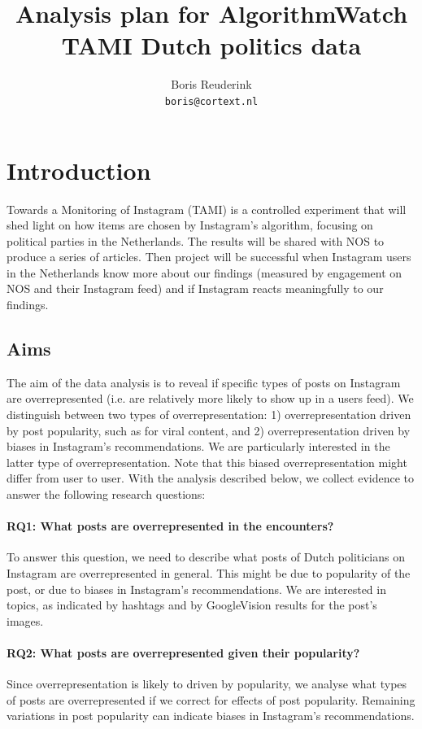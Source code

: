 \documentclass[a4paper]{article}
\author{Boris Reuderink\\\texttt{boris@cortext.nl}}
\title{Analysis plan for AlgorithmWatch TAMI Dutch politics data}
\begin{document}
\maketitle
\tableofcontents
\section{Introduction}
Towards a Monitoring of Instagram (TAMI) is a controlled experiment that will
shed light on how items are chosen by Instagram's algorithm, focusing on
political parties in the Netherlands. The results will be shared with NOS to
produce a series of articles. Then project will be successful when Instagram
users in the Netherlands know more about our findings (measured by engagement
on NOS and their Instagram feed) and if Instagram reacts meaningfully to our
findings.

\subsection{Aims}
The aim of the data analysis is to reveal if specific types of posts on
Instagram are overrepresented (i.e. are relatively more likely to show up in
a users feed). We distinguish between two types of overrepresentation: 1)
overrepresentation driven by post popularity, such as for viral content, and
2) overrepresentation driven by biases in Instagram’s recommendations. We are
particularly interested in the latter type of overrepresentation. Note that
this biased overrepresentation might differ from user to user. With the
analysis described below, we collect evidence to answer the following
research questions:

\label{sec:RQ}
\paragraph{RQ1: What posts are overrepresented in the encounters?}
To answer this question, we need to describe what posts of Dutch politicians on
Instagram are overrepresented in general. This might be due to popularity of
the post, or due to biases in Instagram’s recommendations. We are interested
in topics, as indicated by hashtags and by GoogleVision results for the
post's images.

\paragraph{RQ2: What posts are overrepresented given their
popularity?} Since overrepresentation is likely to driven by popularity, we
analyse what types of posts are overrepresented if we correct for effects of
post popularity. Remaining variations in post popularity can indicate biases
in Instagram’s recommendations.
\end{document}
